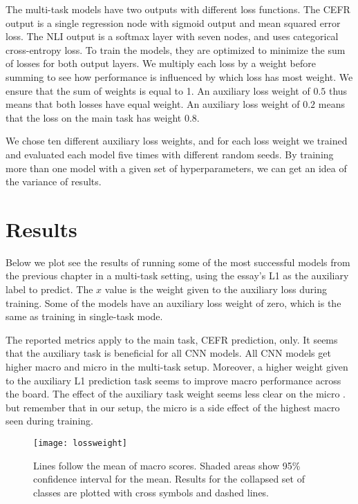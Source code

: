 The multi-task models have two outputs with different loss functions. The
CEFR output is a single regression node with sigmoid output and mean squared
error loss. The NLI output is a softmax layer with seven nodes, and uses
categorical cross-entropy loss. To train the models, they are optimized to
minimize the sum of losses for both output layers. We multiply each loss by a
weight before summing to see how performance is influenced by which loss has
most weight. We ensure that the sum of weights is equal to 1. An auxiliary
loss weight of $0.5$ thus means that both losses have equal weight. An
auxiliary loss weight of $0.2$ means that the loss on the main task has
weight $0.8$.

We chose ten different auxiliary loss weights, and for each loss weight we
trained and evaluated each model five times with different random seeds. By
training more than one model with a given set of hyperparameters, we can get
an idea of the variance of results.

\section{Results}

Below we plot see the results of running some of the most successful models
from the previous chapter in a multi-task setting, using the essay's L1 as
the auxiliary label to predict. The $x$ value is the weight given to the
auxiliary loss during training. Some of the models have an auxiliary loss
weight of zero, which is the same as training in single-task mode.

The reported metrics apply to the main task, CEFR prediction, only. It seems
that the auxiliary task is beneficial for all CNN models. All CNN models get
higher macro and micro \FI in the multi-task setup. Moreover, a higher weight
given to the auxiliary L1 prediction task seems to improve macro \FI
performance across the board. The effect of the auxiliary task weight seems
less clear on the micro \FI. but remember that in our setup, the micro \FI is
a side effect of the highest macro \FI seen during training.

\begin{figure}
  \centering
  \texttt{[image: lossweight]}
  \caption[Performance of multi-task models]{
    Lines follow the mean of macro \FI scores. Shaded areas show 95\% confidence
    interval for the mean. Results for the collapsed set of classes are plotted with
    cross symbols and dashed lines.
  }
  \label{fig:lossweight}
\end{figure}

